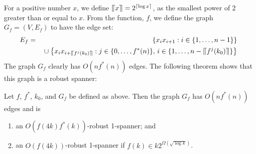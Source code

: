 \documentclass{patmorin}
\newcommand{\upen}[1]{\llceil#1\rrceil}
\begin{document}
For a positive number $x$, we define $\upen{x}=2^{\ceil{\log x}}$, as
the smallest power of 2 greater than or equal to $x$.  From the function,
$f$, we define the graph $G_f=(V,E_f)$ to have the edge set:
\begin{eqnarray*}
    E_f &=& \quad\left\{ x_ix_{i+1} : i\in\{1,\ldots,n-1\} \right\} \\
     && {} \cup \left\{ x_{i}x_{i+\upen{f^j(k_0)}} : j\in\{0,\ldots,f^*(n)\},\,
        i\in\{1,\ldots,n-\upen{f^j(k_0)}\} \right\}
\end{eqnarray*}
The graph $G_f$ clearly has $O(nf^*(n))$ edges.  The following theorem
shows that this graph is a robust spanner:

\begin{thm}
  Let $f$, $f^*$, $k_0$, and $G_f$ be defined as above.  Then the graph
  $G_f$ has $O(nf^*(n))$ edges and is
  \begin{enumerate}
    \item an $O(f(4k)f^*(k))$-robust 1-spanner; and 
    \item an $O(f(4k))$-robust 1-spanner if $f(k)\in k2^{\Omega(\sqrt{\log k})}$.
  \end{enumerate}
\end{thm}
\end{document}
